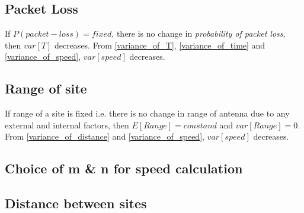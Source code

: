 \documentclass[10pt,twocolumn,letterpaper]{article}
\begin{document}
\subsection{Packet Loss}
If \(P(packet-loss) = fixed \), there is no change in \textit{probability of packet loss}, then \(var[T]\) decreases. From \ref{variance_of_T}, \ref{variance_of_time} and \ref{variance_of_speed}, $var[speed]$ decreases.

\subsection{Range of site}
If range of a site is fixed i.e. there is no change in range of antenna due to any external and internal factors, then \( E[Range] = constand\) and \(var[Range] = 0\). From \ref{variance_of_distance} and  \ref{variance_of_speed}, $var[speed]$ decreases.


\subsection{Choice of m \& n for speed calculation}


\subsection{Distance between sites}



{\small


}
\end{document}
